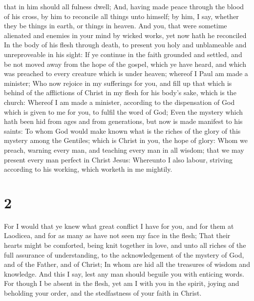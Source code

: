 that in him should all fulness dwell;  And, having made
peace through the blood of his cross, by him to reconcile all things
unto himself; by him, I say, whether they be things in earth, or things
in heaven.  And you, that were sometime alienated and
enemies in your mind by wicked works, yet now hath he reconciled
 In the body of his flesh through death, to present you
holy and unblameable and unreproveable in his sight:  If
ye continue in the faith grounded and settled, and be not moved away
from the hope of the gospel, which ye have heard, and which was preached
to every creature which is under heaven; whereof I Paul am made a
minister;  Who now rejoice in my sufferings for you, and
fill up that which is behind of the afflictions of Christ in my flesh
for his body's sake, which is the church:  Whereof I am
made a minister, according to the dispensation of God which is given to
me for you, to fulfil the word of God;  Even the mystery
which hath been hid from ages and from generations, but now is made
manifest to his saints:  To whom God would make known
what is the riches of the glory of this mystery among the Gentiles;
which is Christ in you, the hope of glory:  Whom we
preach, warning every man, and teaching every man in all wisdom; that we
may present every man perfect in Christ Jesus:  Whereunto
I also labour, striving according to his working, which worketh in me
mightily.

\hypertarget{section-1}{%
\section{2}\label{section-1}}

 For I would that ye knew what great conflict I have for
you, and for them at Laodicea, and for as many as have not seen my face
in the flesh;  That their hearts might be comforted, being
knit together in love, and unto all riches of the full assurance of
understanding, to the acknowledgement of the mystery of God, and of the
Father, and of Christ;  In whom are hid all the treasures
of wisdom and knowledge.  And this I say, lest any man
should beguile you with enticing words.  For though I be
absent in the flesh, yet am I with you in the spirit, joying and
beholding your order, and the stedfastness of your faith in Christ.

